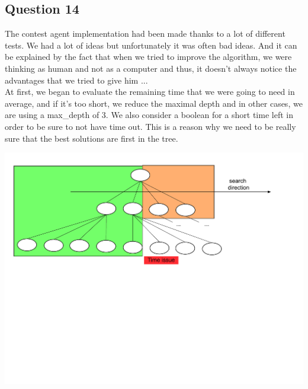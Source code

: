 \documentclass[10pt]{report}
\begin{document}
\subsection*{Question 14}
The contest agent implementation had been made thanks to a lot of different tests. We had a lot of ideas but unfortunately it was often bad ideas. And it can be explained by the fact that when we tried to improve the algorithm, we were thinking as human and not as a computer and thus, it doesn't always notice the advantages that we tried to give him ...\\
At first, we began to evaluate the remaining time that we were going to need in average, and if it's too short, we reduce the maximal depth and in other cases, we are using a max\_depth of 3. We also consider a boolean for a short time left in order to be sure to not have time out. This is a reason why we need to be really sure that the best solutions are first in the tree.\\

\begin{center}
\includegraphics[scale=0.4]{search_with_time.pdf}
\end{center}
\end{document}
